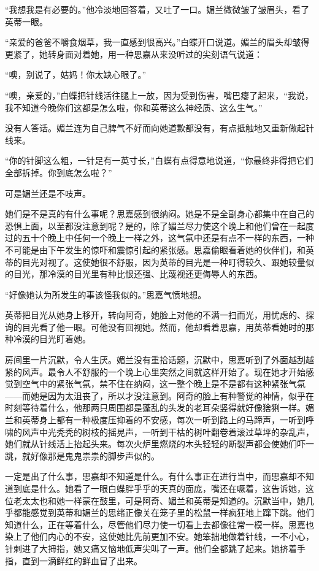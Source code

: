 \par “我想我是有必要的。”他冷淡地回答着，又吐了一口。媚兰微微皱了皱眉头，看了英蒂一眼。
\par “亲爱的爸爸不嚼食烟草，我一直感到很高兴。”白蝶开口说道。媚兰的眉头却皱得更紧了，她转身面对着她，用一种思嘉从来没听过的尖刻语气说道：
\par “噢，别说了，姑妈！你太缺心眼了。”
\par “噢，亲爱的，”白蝶把针线活往腿上一放，因为受到伤害，嘴巴瘪了起来，“我说，我不知道今晚你们这都是怎么啦，你和英蒂这么神经质、这么生气。”
\par 没有人答话。媚兰连为自己脾气不好而向她道歉都没有，有点抵触地又重新做起针线来。
\par “你的针脚这么粗，一针足有一英寸长，”白蝶有点得意地说道，“你最终非得把它们全部拆掉。你到底怎么啦？”
\par 可是媚兰还是不吱声。
\par 她们是不是真的有什么事呢？思嘉感到很纳闷。她是不是全副身心都集中在自己的恐惧上面，以至都没注意到呢？是的，除了媚兰尽力使这个晚上和他们曾在一起度过的五十个晚上中任何一个晚上一样之外，这气氛中还是有点不一样的东西，一种不可能是由下午发生的惊吓和震惊引起的紧张感。思嘉偷眼看着她的伙伴们，和英蒂的目光对视了。这使她很不舒服，因为英蒂的目光是一种盯得较久、跟她较量似的目光，那冷漠的目光里有种比恨还强、比蔑视还更侮辱人的东西。
\par “好像她认为所发生的事该怪我似的。”思嘉气愤地想。
\par 英蒂把目光从她身上移开，转向阿奇，她脸上对他的不满一扫而光，用忧虑的、探询的目光看了他一眼。可他没有回视她。然而，他却看着思嘉，用英蒂看她时的那种冷漠的目光盯着她。
\par 房间里一片沉默，令人生厌。媚兰没有重拾话题，沉默中，思嘉听到了外面越刮越紧的风声。最令人不舒服的一个晚上心里突然之间就这样开始了。现在她才开始感觉到空气中的紧张气氛，禁不住在纳闷，这一整个晚上是不是都有这种紧张气氛——而她是因为太沮丧了，所以才没注意到。阿奇的脸上有种警觉的神情，似乎在时刻等待着什么，他那两只周围都是蓬乱的头发的老耳朵竖得就好像猞猁一样。媚兰和英蒂身上都有一种极度压抑着的不安感，每次一听到路上的马蹄声，一听到呼啸的风声中光秃秃的树枝的摇晃声，一听到干枯的树叶翻卷着滚过草坪的杂乱声，她们就从针线活上抬起头来。每次火炉里燃烧的木头轻轻的断裂声都会使她们吓一跳，就好像那是鬼鬼祟祟的脚步声似的。
\par 一定是出了什么事，思嘉却不知道是什么。有什么事正在进行当中，而思嘉却不知道到底是什么。她看了一眼白蝶胖乎乎的天真的面庞，嘴还在噘着，这告诉她，这位老太太也和她一样蒙在鼓里，可是阿奇、媚兰和英蒂是知道的。沉默当中，她几乎都能感觉到英蒂和媚兰的思绪正像关在笼子里的松鼠一样疯狂地上蹿下跳。他们知道什么，正在等着什么，尽管他们尽力使一切看上去都像往常一模一样。思嘉也染上了他们内心的不安，这使她比先前更加不安。她笨拙地做着针线，一不小心，针刺进了大拇指，她又痛又恼地低声尖叫了一声。他们全都跳了起来。她挤着手指，直到一滴鲜红的鲜血冒了出来。
